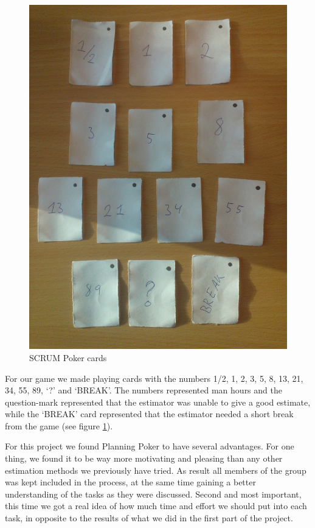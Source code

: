 \begin{figure}[t]
  \centering
  \includegraphics[width=\textwidth, angle=270]{illustrations/scrumPokerCards.jpg}
  \caption{SCRUM Poker cards}
  \label{fig:scrumPokerCards}
\end{figure}

For our game we made playing cards with the numbers 1/2, 1, 2, 3, 5, 8, 13, 21, 34, 55, 89, `?' and `BREAK'. The numbers represented man hours and the question-mark represented that the estimator was unable to give a good estimate, while the `BREAK' card represented that the estimator needed a short break from the game (see figure \ref{fig:scrumPokerCards}).

For this project we found Planning Poker to have several advantages. For one thing, we found it to be way more motivating and pleasing than any other estimation methods we previously have tried. As result all members of the group was kept included in the process, at the same time gaining a better understanding of the tasks as they were discussed.
Second and most important, this time we got a real idea of how much time and effort we should put into each task, in opposite to the results of what we did in the first part of the project.

